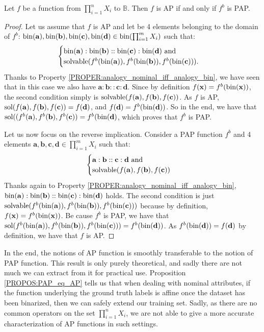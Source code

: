 \begin{proposition}
  \label{PROPOS:PAP_eq_AP}
Let $f$ be a function from $\prod_{i=1}^n X_i$ to $\mathbb{B}$. Then $f$ is AP
if and only if $f^b$ is PAP.
\end{proposition}
\begin{proof}
  Let us assume that $f$ is AP and let be 4 elements belonging to the domain of
  $f^b$: $\text{bin}(\mathbf{a}),\text{bin}(\mathbf{b}), \text{bin}(\mathbf{c}), \text{bin}(\mathbf{d})
  \in \text{bin}(\prod_{i=1}^m X_i)$ such that:
  $$\begin{cases}
    \text{bin}(\mathbf{a}):\text{bin}(\mathbf{b})::\text{bin}(\mathbf{c}):\text{bin}(\mathbf{d}) \mbox{
      and}\\
    \text{solvable}(f^b(\text{bin}(\mathbf{a})),f^b(\text{bin}(\mathbf{b})),f^b(\text{bin}(\mathbf{c}))).
  \end{cases}
  $$
Thanks to Property \ref{PROPER:analogy_nominal_iff_analogy_bin}, we have seen
  that in this case we also have
  $\mathbf{a}:\mathbf{b}::\mathbf{c}:\mathbf{d}$.  Since by definition
  $f(\mathbf{x}) = f^b(\text{bin}(\mathbf{x}))$,  the second condition simply is
  $\text{solvable}(f(\mathbf{a}),f(\mathbf{b}),f(\mathbf{c}))$. As $f$ is AP,
  $\text{sol}(f(\mathbf{a}),f(\mathbf{b}),f(\mathbf{c}))= f(\mathbf{d})$, and
  $f(\mathbf{d}) = f^b(\text{bin}(\mathbf{d}))$. So in the end, we have that
  $\text{sol}((f^b(\mathbf{a}),f^b(\mathbf{b}),f^b(\mathbf{c})) =
  f^b(\text{bin}(\mathbf{d})$, which proves that $f^b$ is PAP.

  Let us now focus on the reverse implication. Consider a PAP function
  $f^b$ and 4 elements $\mathbf{a}, \mathbf{b}, \mathbf{c}, \mathbf{d} \in
  \prod_{i=1}^m X_i$ such that:
  $$
  \begin{cases}
  \mathbf{a}:\mathbf{b}::\mathbf{c}:\mathbf{d} \mbox{ and}\\
  \text{solvable}(f(\mathbf{a}),f(\mathbf{b}),f(\mathbf{c}))
  \end{cases}
  $$
  Thanks again to Property \ref{PROPER:analogy_nominal_iff_analogy_bin},
  $\text{bin}(\mathbf{a}):\text{bin}(\mathbf{b})::\text{bin}(\mathbf{c}):\text{bin}(\mathbf{d})$ holds. 
  The second condition is just
  $\text{solvable}(f^b(\text{bin}(\mathbf{a})),f^b(\text{bin}(\mathbf{b})),f^b(\text{bin}(\mathbf{c})))$
  because by definition, $f(\mathbf{x}) = f^b(\text{bin}(\mathbf{x}))$. Be cause
  $f^b$ is PAP, we have that
  $\text{sol}(f^b(\text{bin}(\mathbf{a})),f^b(\text{bin}(\mathbf{b})),f^b(\text{bin}(\mathbf{c}))) =
  f^b(\text{bin}(\mathbf{d}))$. As $f^b(\text{bin}(\mathbf{d}))=f(\mathbf{d})$ by
  definition, we have that $f$ is AP.
\end{proof}

In the end, the notions of AP function is smoothly transferable to the notion
of PAP function. This result is only purely theoretical, and sadly there are
not much we can extract from it for practical use. Proposition
\ref{PROPOS:PAP_eq_AP} tells us that when dealing with nominal attributes, if
the function underlying the ground truth labels is affine once the dataset has
been binarized, then we can safely extend our training set. Sadly, as there are
no common operators on the set  $\prod_{i=1}^n X_i$, we are not able to give a
more accurate characterization of AP functions in such settings.

